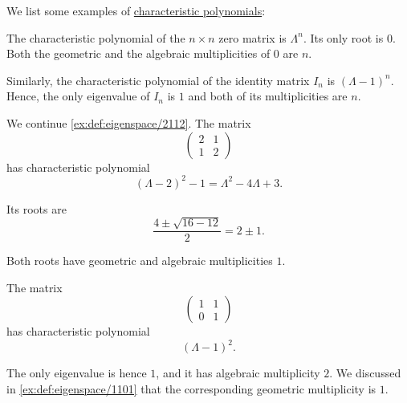 \begin{example}\label{ex:def:linear_operator_characteristic_polynomial}
  We list some examples of \hyperref[def:linear_operator_characteristic_polynomial]{characteristic polynomials}:
  \begin{thmenum}
     The characteristic polynomial of the \( n \times n \) zero matrix is \( \Lambda^n \). Its only root is \( 0 \). Both the geometric and the algebraic multiplicities of \( 0 \) are \( n \).

     Similarly, the characteristic polynomial of the identity matrix \( I_n \) is \( (\Lambda - 1)^n \). Hence, the only eigenvalue of \( I_n \) is \( 1 \) and both of its multiplicities are \( n \).

     We continue \cref{ex:def:eigenspace/2112}. The matrix
    \begin{equation*}
      \begin{pmatrix}
        2 & 1 \\
        1 & 2
      \end{pmatrix}
    \end{equation*}
    has characteristic polynomial
    \begin{equation*}
      (\Lambda - 2)^2 - 1 = \Lambda^2 - 4\Lambda + 3.
    \end{equation*}

    Its roots are
    \begin{equation*}
      \frac {4 \pm \sqrt{16 - 12}} 2 = 2 \pm 1.
    \end{equation*}

    Both roots have geometric and algebraic multiplicities \( 1 \).

     The matrix
    \begin{equation*}
      \begin{pmatrix}
        1 & 1 \\
        0 & 1
      \end{pmatrix}
    \end{equation*}
    has characteristic polynomial
    \begin{equation*}
      (\Lambda - 1)^2.
    \end{equation*}

    The only eigenvalue is hence \( 1 \), and it has algebraic multiplicity \( 2 \). We discussed in \cref{ex:def:eigenspace/1101} that the corresponding geometric multiplicity is \( 1 \).
  \end{thmenum}
\end{example}

